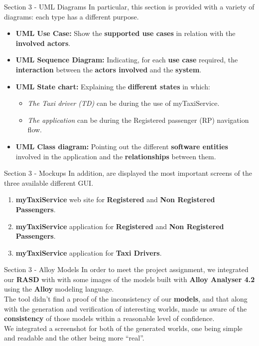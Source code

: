 \documentclass{../common/latex_classes/pdf_presentation}
\begin{document}
	\begin{frame}{Section 3 - UML Diagrams}
		In particular, this section is provided with a variety of diagrams: each type has a different purpose.\\
		\begin{itemize}
			\item\textbf{UML Use Case:} Show the \textbf{supported use cases} in relation with the \textbf{involved actors}.
			\item\textbf{UML Sequence Diagram:} Indicating, for each \textbf{use case} required, the \textbf{interaction} between the \textbf{actors involved} and the \textbf{system}.
			\item\textbf{UML State chart:} Explaining the \textbf{different states} in which:\\
											\begin{itemize}
												\item\textit{The Taxi driver (TD)} can be during the use of myTaxiService.
												\item\textit{The application} can be during the Registered passenger (RP) navigation flow.
											\end{itemize}
			\item\textbf{UML Class diagram:} Pointing out the different \textbf{software entities} involved in the application and the \textbf{relationships} between them.
		\end{itemize}
	\end{frame}
	
	\begin{frame}{Section 3 - Mockups}
		In addition, are displayed the most important screens of the three available different GUI.
		\begin{enumerate}
			\item \textbf{myTaxiService} web site for \textbf{Registered} and \textbf{Non Registered Passengers}.
			\item \textbf{myTaxiService} application for \textbf{Registered} and \textbf{Non Registered Passengers}.
			\item \textbf{myTaxiService} application for \textbf{Taxi Drivers}.
		\end{enumerate}
	\end{frame}
	
	\begin{frame}{Section 3 - Alloy Models}
		In order to meet the project assignment, we integrated our \textbf{RASD} with with some images of the models built with \textbf{Alloy Analyser 4.2} using the \textbf{Alloy} modeling language.\\
		The tool didn't find a proof of the inconsistency of our \textbf{models}, and that along with the generation and verification of interesting worlds, made us aware of the \textbf{consistency} of those models within a reasonable level of confidence.\\
		We integrated a screenshot for both of the generated worlds, one being simple and readable and the other being more “real”.
	\end{frame}
	
\end{document}
